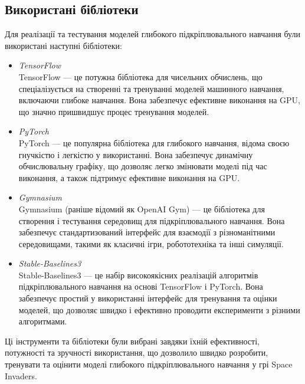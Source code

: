  \subsection{Використані бібліотеки}
 
 Для реалізації та тестування моделей глибокого підкріплювального навчання були використані наступні бібліотеки:
 
 \begin{itemize}
     \item \emph{TensorFlow}\\
     TensorFlow — це потужна бібліотека для чисельних обчислень, що спеціалізується на створенні та тренуванні моделей машинного навчання, включаючи глибоке навчання. Вона забезпечує ефективне виконання на GPU, що значно пришвидшує процес тренування моделей.
 
     \item \emph{PyTorch}\\
     PyTorch — це популярна бібліотека для глибокого навчання, відома своєю гнучкістю і легкістю у використанні. Вона забезпечує динамічну обчислювальну графіку, що дозволяє легко змінювати моделі під час виконання, а також підтримує ефективне виконання на GPU.
 
     \item \emph{Gymnasium}\\
     Gymnasium (раніше відомий як OpenAI Gym) — це бібліотека для створення і тестування середовищ для підкріплювального навчання. Вона забезпечує стандартизований інтерфейс для взаємодії з різноманітними середовищами, такими як класичні ігри, робототехніка та інші симуляції.
 
     \item \emph{Stable-Baselines3}\\
     Stable-Baselines3 — це набір високоякісних реалізацій алгоритмів підкріплювального навчання на основі TensorFlow і PyTorch. Вона забезпечує простий у використанні інтерфейс для тренування та оцінки моделей, що дозволяє швидко і ефективно проводити експерименти з різними алгоритмами.
 \end{itemize}
 
 Ці інструменти та бібліотеки були вибрані завдяки їхній ефективності, потужності та зручності використання, що дозволило швидко розробити, тренувати та оцінити моделі глибокого підкріплювального навчання у грі Space Invaders.
 
